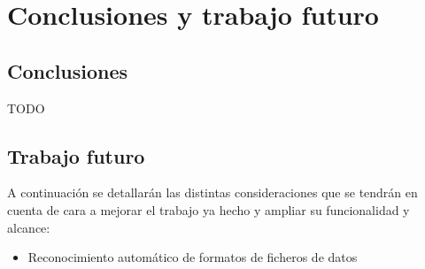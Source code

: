 \chapter{Conclusiones y trabajo futuro\label{CAP:CONCTRAB}}
  \section{Conclusiones\label{SEC:CONCLUSIONES}}
    TODO
  \section{Trabajo futuro\label{SEC:TRABAJO}}
    A continuación se detallarán las distintas consideraciones que se tendrán en cuenta de cara a mejorar el trabajo ya hecho y ampliar su funcionalidad y alcance:
    
    \begin{itemize}
      \item Reconocimiento automático de formatos de ficheros de datos
    \end{itemize}